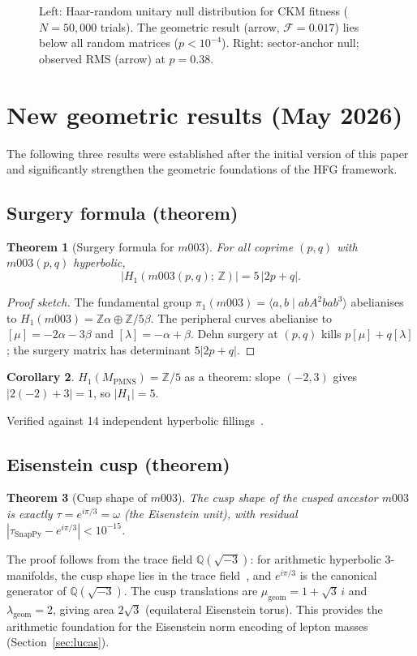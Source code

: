 ﻿\documentclass[12pt]{article}
\newtheorem{theorem}{Theorem}
\theoremstyle{definition}
\newtheorem{corollary}[theorem]{Corollary}
\begin{document}
\begin{figure}[htbp]
\centering
\caption{Left: Haar-random unitary null distribution for CKM fitness
($N=50{,}000$ trials). The geometric result (arrow, $\mathcal{F}=0.017$)
lies below all random matrices ($p<10^{-4}$).
Right: sector-anchor null; observed RMS (arrow) at $p=0.38$.}
\label{fig:nulltests}
\end{figure}


\section{New geometric results (May 2026)}
\label{sec:new_results}

The following three results were established after the initial
version of this paper and significantly strengthen the geometric
foundations of the HFG framework.

\subsection{Surgery formula (theorem)}
\begin{theorem}[Surgery formula for $m003$]
For all coprime $(p,q)$ with $m003(p,q)$ hyperbolic,
\[
  |H_1(m003(p,q);\,\mathbb{Z})| = 5\,|2p+q|.
\]
\end{theorem}
\begin{proof}[Proof sketch]
The fundamental group $\pi_1(m003) = \langle a,b \mid abA^2bab^3\rangle$
abelianises to $H_1(m003) = \mathbb{Z}\alpha\oplus\mathbb{Z}/5\beta$.
The peripheral curves abelianise to $[\mu]=-2\alpha-3\beta$ and
$[\lambda]=-\alpha+\beta$.
Dehn surgery at $(p,q)$ kills $p[\mu]+q[\lambda]$; the surgery
matrix has determinant $5|2p+q|$.
\end{proof}
\begin{corollary}
$H_1(M_\mathrm{PMNS}) = \mathbb{Z}/5$ as a theorem:
slope $(-2,3)$ gives $|2(-2)+3|=1$, so $|H_1|=5$.
\end{corollary}
Verified against 14 independent hyperbolic fillings~\cite{Gentry:Unified}.

\subsection{Eisenstein cusp (theorem)}
\begin{theorem}[Cusp shape of $m003$]
The cusp shape of the cusped ancestor $m003$ is exactly
$\tau = e^{i\pi/3} = \omega$ (the Eisenstein unit), with
residual $|\tau_\mathrm{SnapPy} - e^{i\pi/3}| < 10^{-15}$.
\end{theorem}
The proof follows from the trace field $\mathbb{Q}(\sqrt{-3})$:
for arithmetic hyperbolic 3-manifolds, the cusp shape lies in
the trace field~\cite{MaclachlanReid}, and $e^{i\pi/3}$ is the
canonical generator of $\mathbb{Q}(\sqrt{-3})$.
The cusp translations are $\mu_\mathrm{geom}=1+\sqrt{3}\,i$ and
$\lambda_\mathrm{geom}=2$, giving area $2\sqrt{3}$ (equilateral
Eisenstein torus).
This provides the arithmetic foundation for the Eisenstein norm
encoding of lepton masses (Section~\ref{sec:lucas}).
\end{document}
